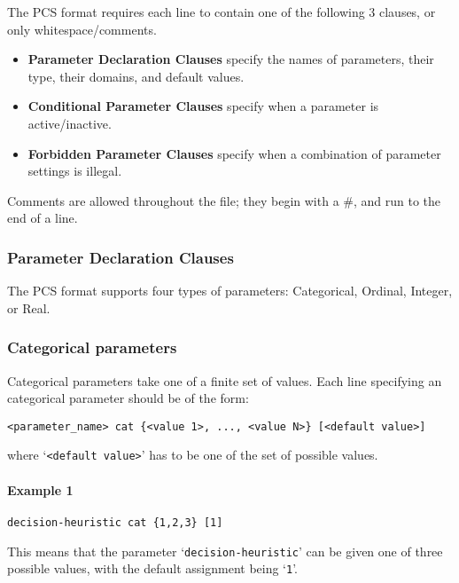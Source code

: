 \documentclass[manual.tex]{subfiles}
\begin{document}
The PCS format requires each line to contain one of the following 3 clauses, or only whitespace/comments.
\begin{itemize}
\item \textbf{Parameter Declaration Clauses} specify the names of parameters, their type, their domains, and default values.
\item \textbf{Conditional Parameter Clauses} specify when a parameter is active/inactive.
\item \textbf{Forbidden Parameter Clauses} specify when a combination of parameter settings is illegal.
\end{itemize}
Comments are allowed throughout the file; they begin with a \#, and run to the end of a line. 

\subsubsection{Parameter Declaration Clauses}\label{sec:param_decl_clauses}

The PCS format supports four types of parameters: Categorical, Ordinal, Integer, or Real.

\subsubsection*{Categorical parameters} \label{sec:categorical-params}
Categorical parameters take one of a finite set of values. Each line specifying an categorical parameter should be of the form:

\begin{verbatim}
<parameter_name> cat {<value 1>, ..., <value N>} [<default value>]
\end{verbatim}
where `\texttt{<default value>}' has to be one of the set of possible values. 

\paragraph{Example 1}
\begin{verbatim}
decision-heuristic cat {1,2,3} [1]
\end{verbatim}
This means that the parameter `\texttt{decision-heuristic}' can be given one of three possible values, with the default assignment being `\texttt{1}'.
\end{document}
